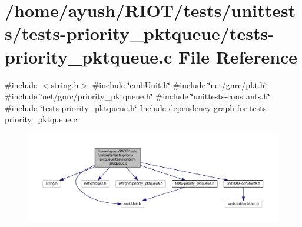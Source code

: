 \hypertarget{tests-priority__pktqueue_8c}{}\section{/home/ayush/\+R\+I\+O\+T/tests/unittests/tests-\/priority\+\_\+pktqueue/tests-\/priority\+\_\+pktqueue.c File Reference}
\label{tests-priority__pktqueue_8c}
{\ttfamily \#include $<$string.\+h$>$}\newline
{\ttfamily \#include \char`\"{}emb\+Unit.\+h\char`\"{}}\newline
{\ttfamily \#include \char`\"{}net/gnrc/pkt.\+h\char`\"{}}\newline
{\ttfamily \#include \char`\"{}net/gnrc/priority\+\_\+pktqueue.\+h\char`\"{}}\newline
{\ttfamily \#include \char`\"{}unittests-\/constants.\+h\char`\"{}}\newline
{\ttfamily \#include \char`\"{}tests-\/priority\+\_\+pktqueue.\+h\char`\"{}}\newline
Include dependency graph for tests-\/priority\+\_\+pktqueue.c\+:
\nopagebreak
\begin{figure}[H]
\begin{center}
\leavevmode
\includegraphics[width=350pt]{tests-priority__pktqueue_8c__incl}
\end{center}
\end{figure}
